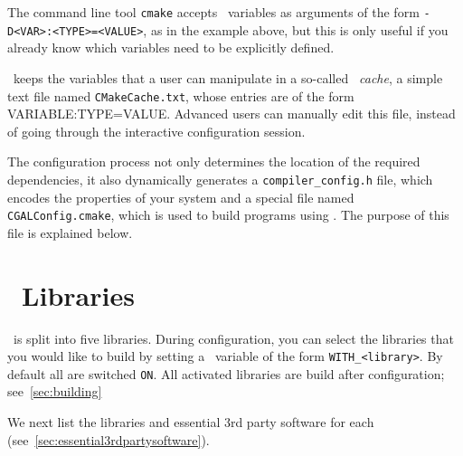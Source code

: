 The command line tool \texttt{cmake} accepts \cmake\ variables as arguments of the form \texttt{-D<VAR>:<TYPE>=<VALUE>}, as
in the example above, but this is only useful if you already know which variables need to be explicitly defined.

\begin{ccAdvanced}
\cmake\ keeps the variables that a user can manipulate in a so-called \emph{\cmake\ cache}, a simple text file 
named \texttt{CMakeCache.txt}, whose entries are of the form VARIABLE:TYPE=VALUE. Advanced users can manually edit this 
file, instead of going through the interactive configuration session.
\end{ccAdvanced}


The configuration process not only determines the location of the required dependencies, it also dynamically generates a
\texttt{compiler\_config.h} file, which encodes the properties of your system and a special file named 
\texttt{CGALConfig.cmake}, which is used to build programs using \cgal. The
purpose of this file is explained below.

\section{\cgal\ Libraries\label{sec:libraries}}

\cgal\ is split into five libraries. During configuration, you can select the libraries that 
you would like to build by setting a \cmake\ variable of the form \texttt{WITH\_<library>}. By default all 
are switched \texttt{ON}. All activated libraries are build after
configuration; see~\ref{sec:building}

We next list the libraries and essential 3rd party software for each (see~\ref{sec:essential3rdpartysoftware}).

